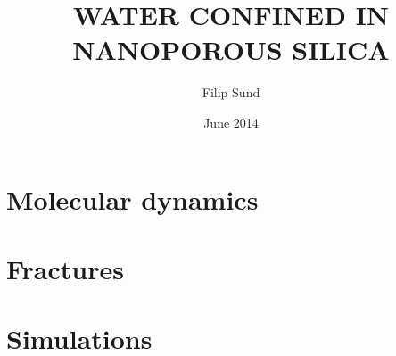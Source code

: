 \documentclass[twoside,english,a4paper,12pt]{uiofysmaster}
\author{Filip Sund}
\title{\uppercase{Water confined in\\ nanoporous silica}}
\date{June 2014}
\begin{document}

\cleardoublepage


% 


\tableofcontents



\part{Molecular dynamics}
    
    
        
        
        
        
        
        
    
        
        
        
    
        
        

\part{Fractures}
    
    
        
        
    
        
        
            
            
            
            
        
            

\part{Simulations}
    
    
        
        
        \FloatBarrier
        
    
        
        
        \FloatBarrier
        
        
        
        \FloatBarrier
        
        
        
\end{document}
